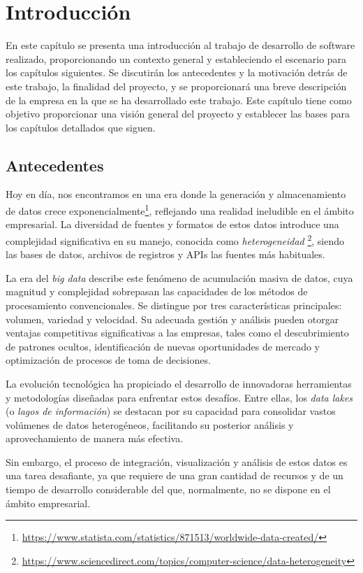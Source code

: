 \chapter{Introducción}\label{chap:intro}
En este capítulo se presenta una introducción al trabajo de desarrollo de software realizado,
proporcionando un contexto general y estableciendo el escenario para los capítulos siguientes.
Se discutirán los antecedentes y la motivación detrás de este trabajo, la finalidad del proyecto,
y se proporcionará una breve descripción de la empresa en la que se ha desarrollado este trabajo.
Este capítulo tiene como objetivo proporcionar una visión general del proyecto y establecer las
bases para los capítulos detallados que siguen.

\section{Antecedentes}\label{sec:antecedentes}
Hoy en día, nos encontramos en una era donde la generación y almacenamiento de datos crece
exponencialmente\footnote{\url{https://www.statista.com/statistics/871513/worldwide-data-created/}},
reflejando una realidad ineludible en el ámbito empresarial. La diversidad de fuentes y formatos de
estos datos introduce una complejidad significativa en su manejo, conocida como \textit{heterogeneidad}
\footnote{\url{https://www.sciencedirect.com/topics/computer-science/data-heterogeneity}}, siendo las
bases de datos, archivos de registros y APIs las fuentes más habituales.

La era del \textit{big data} describe este fenómeno de acumulación masiva de datos, cuya magnitud y
complejidad sobrepasan las capacidades de los métodos de procesamiento convencionales. Se distingue
por tres características principales: volumen, variedad y velocidad. Su adecuada gestión y análisis
pueden otorgar ventajas competitivas significativas a las empresas, tales como el descubrimiento de
patrones ocultos, identificación de nuevas oportunidades de mercado y optimización de procesos de toma
de decisiones.

La evolución tecnológica ha propiciado el desarrollo de innovadoras herramientas y metodologías
diseñadas para enfrentar estos desafíos. Entre ellas, los \textit{data lakes} (o \emph{lagos de
información}) se destacan por su capacidad para consolidar vastos volúmenes de datos heterogéneos,
facilitando su posterior análisis y aprovechamiento de manera más efectiva.

Sin embargo, el proceso de integración, visualización y análisis de estos datos es una tarea desafiante,
ya que requiere de una gran cantidad de recursos y de un tiempo de desarrollo considerable del que,
normalmente, no se dispone en el ámbito empresarial.


